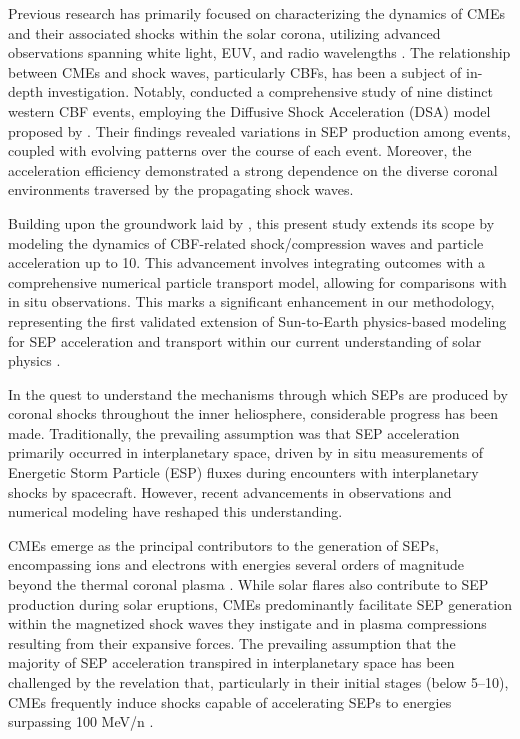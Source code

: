Previous research has primarily focused on characterizing the dynamics of CMEs and their associated shocks within the solar corona, utilizing advanced observations spanning white light, EUV, and radio wavelengths \citep{vourlidas_2003, zhang_2006, bein_2011}. The relationship between CMEs and shock waves, particularly CBFs, has been a subject of in-depth investigation. Notably, \citet{kozarev_2019} conducted a comprehensive study of nine distinct western CBF events, employing the Diffusive Shock Acceleration (DSA) model proposed by \citet{kozarev_2016}. Their findings revealed variations in SEP production among events, coupled with evolving patterns over the course of each event. Moreover, the acceleration efficiency demonstrated a strong dependence on the diverse coronal environments traversed by the propagating shock waves.

Building upon the groundwork laid by \citet{kozarev_2019}, this present study extends its scope by modeling the dynamics of CBF-related shock/compression waves and particle acceleration up to 10\rsun. This advancement involves integrating outcomes with a comprehensive numerical particle transport model, allowing for comparisons with in situ observations. This marks a significant enhancement in our methodology, representing the first validated extension of Sun-to-Earth physics-based modeling for SEP acceleration and transport within our current understanding of solar physics \citep{kozarev_2022}.

In the quest to understand the mechanisms through which SEPs are produced by coronal shocks throughout the inner heliosphere, considerable progress has been made. Traditionally, the prevailing assumption was that SEP acceleration primarily occurred in interplanetary space, driven by in situ measurements of Energetic Storm Particle (ESP) fluxes during encounters with interplanetary shocks by spacecraft. However, recent advancements in observations and numerical modeling have reshaped this understanding.

CMEs emerge as the principal contributors to the generation of SEPs, encompassing ions and electrons with energies several orders of magnitude beyond the thermal coronal plasma \citep{reames_1999}. While solar flares also contribute to SEP production during solar eruptions, CMEs predominantly facilitate SEP generation within the magnetized shock waves they instigate and in plasma compressions resulting from their expansive forces. The prevailing assumption that the majority of SEP acceleration transpired in interplanetary space has been challenged by the revelation that, particularly in their initial stages (below 5–10\rsun), CMEs frequently induce shocks capable of accelerating SEPs to energies surpassing 100 MeV/n \citep{ontiveross_2009, gopalswamy_2011, battarbee_2013, kozarev_2013, schwadron_2014, kong_2017}.

